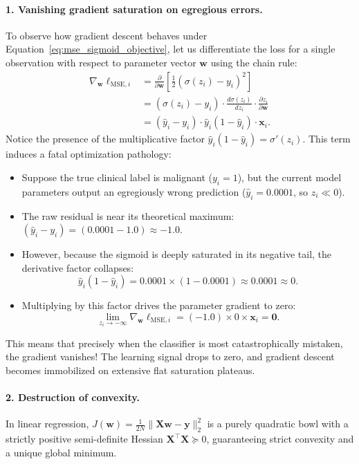 \paragraph{1. Vanishing gradient saturation on egregious errors.}
To observe how gradient descent behaves under Equation~\eqref{eq:mse_sigmoid_objective}, let us differentiate the loss for a single observation with respect to parameter vector $\mathbf{w}$ using the chain rule:
\begin{align}
\nabla_{\mathbf{w}} \ell_{\text{MSE}, i} &= \frac{\partial}{\partial \mathbf{w}} \left[ \frac{1}{2} (\sigma(z_i) - y_i)^2 \right] \nonumber \\
&= (\sigma(z_i) - y_i) \cdot \frac{d\sigma(z_i)}{dz_i} \cdot \frac{\partial z_i}{\partial \mathbf{w}} \nonumber \\
&= (\hat{y}_i - y_i) \cdot \hat{y}_i(1 - \hat{y}_i) \cdot \mathbf{x}_i.
\label{eq:mse_sigmoid_gradient}
\end{align}
Notice the presence of the multiplicative factor $\hat{y}_i(1 - \hat{y}_i) = \sigma'(z_i)$. This term induces a fatal optimization pathology:
\begin{itemize}[noitemsep]
  \item Suppose the true clinical label is malignant ($y_i = 1$), but the current model parameters output an egregiously wrong prediction ($\hat{y}_i = 0.0001$, so $z_i \ll 0$).
  \item The raw residual is near its theoretical maximum: $(\hat{y}_i - y_i) = (0.0001 - 1.0) \approx -1.0$.
  \item However, because the sigmoid is deeply saturated in its negative tail, the derivative factor collapses:
  \begin{equation}
  \hat{y}_i(1 - \hat{y}_i) = 0.0001 \times (1 - 0.0001) \approx 0.0001 \approx 0.
  \end{equation}
  \item Multiplying by this factor drives the parameter gradient to zero:
  \begin{equation}
  \lim_{z_i \to -\infty} \nabla_{\mathbf{w}} \ell_{\text{MSE}, i} = (-1.0) \times 0 \times \mathbf{x}_i = \mathbf{0}.
  \end{equation}
\end{itemize}
This means that precisely when the classifier is most catastrophically mistaken, the gradient vanishes! The learning signal drops to zero, and gradient descent becomes immobilized on extensive flat saturation plateaus.

\paragraph{2. Destruction of convexity.}
In linear regression, $J(\mathbf{w}) = \frac{1}{2N}\|\mathbf{X}\mathbf{w} - \mathbf{y}\|_2^2$ is a purely quadratic bowl with a strictly positive semi-definite Hessian $\mathbf{X}^\top \mathbf{X} \succeq 0$, guaranteeing strict convexity and a unique global minimum. 

